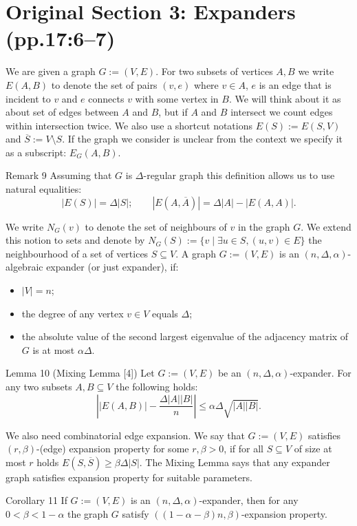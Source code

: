 \section*{Original Section 3: Expanders (pp.17:6--7)}
We are given a graph $G:=(V,E)$. For two subsets of vertices $A,B$ we write $E(A,B)$ to denote the set of pairs $(v,e)$ where $v\in A$, $e$ is an edge that is incident to $v$ and $e$ connects $v$ with some vertex in $B$. We will think about it as about set of edges between $A$ and $B$, but if $A$ and $B$ intersect we count edges within intersection twice. We also use a shortcut notations $E(S):=E(S,V)$ and $\overline S:=V\setminus S$. If the graph we consider is unclear from the context we specify it as a subscript: $E_G(A,B)$.
\begin{result}{Remark 9}
Assuming that $G$ is $\Delta$-regular graph this definition allows us to use natural equalities:
\[|E(S)|=\Delta|S|;\qquad |E(A,\overline A)|=\Delta|A|-|E(A,A)|.\]
\end{result}
We write $N_G(v)$ to denote the set of neighbours of $v$ in the graph $G$. We extend this notion to sets and denote by $N_G(S):=\{v\mid\exists u\in S,(u,v)\in E\}$ the neighbourhood of a set of vertices $S\subseteq V$.
A graph $G:=(V,E)$ is an $(n,\Delta,\alpha)$-algebraic expander (or just expander), if:
\begin{itemize}\item $|V|=n$;
\item the degree of any vertex $v\in V$ equals $\Delta$;
\item the absolute value of the second largest eigenvalue of the adjacency matrix of $G$ is at most $\alpha\Delta$.\end{itemize}
\begin{result}{Lemma 10 (Mixing Lemma [4])}
Let $G:=(V,E)$ be an $(n,\Delta,\alpha)$-expander. For any two subsets $A,B\subseteq V$ the following holds:
\[\left||E(A,B)|-\frac{\Delta|A||B|}{n}\right|\le\alpha\Delta\sqrt{|A||B|}.\]
\end{result}
We also need combinatorial edge expansion. We say that $G:=(V,E)$ satisfies $(r,\beta)$-(edge) expansion property for some $r,\beta>0$, if for all $S\subseteq V$ of size at most $r$ holds $E(S,\overline S)\ge\beta\Delta|S|$. The Mixing Lemma says that any expander graph satisfies expansion property for suitable parameters.
\begin{result}{Corollary 11}
If $G:=(V,E)$ is an $(n,\Delta,\alpha)$-expander, then for any $0<\beta<1-\alpha$ the graph $G$ satisfy $((1-\alpha-\beta)n,\beta)$-expansion property.
\end{result}
